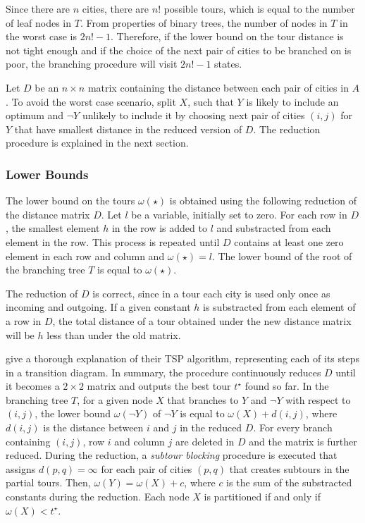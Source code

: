 \documentclass[a4paper,12pt]{article}
\begin{document}
Since there are $n$ cities, there are $n!$ possible tours, which is equal to the number of leaf nodes in $T$. From properties of binary trees, the number of nodes in $T$ in the worst case is $2n! - 1$. Therefore, if the lower bound on the tour distance is not tight enough and if the choice of the next pair of cities to be branched on is poor, the branching procedure will visit $2n! - 1$ states.

Let $D$ be an $n \times n$ matrix containing the distance between each pair of cities in $A$. To avoid the worst case scenario, \citet{Little63} split $X$, such that $Y$ is likely to include an optimum and $\neg Y$ unlikely to include it by choosing next pair of cities $(i,j)$ for $Y$ that have smallest distance in the reduced version of $D$. The reduction procedure is explained in the next section.

\subsubsection*{Lower Bounds}

The lower bound on the tours $\omega(\star)$ is obtained using the following reduction of the distance matrix $D$. Let $l$ be a variable, initially set to zero. For each row in $D$, the smallest element $h$ in the row is added to $l$ and substracted from each element in the row. This process is repeated until $D$ contains at least one zero element in each row and column and $\omega(\star) = l$. The lower bound of the root of the branching tree $T$ is equal to $\omega(\star)$.

The reduction of $D$ is correct, since in a tour each city is used only once as incoming and outgoing. If a given constant $h$ is substracted from each element of a row in $D$, the total distance of a tour obtained under the new distance matrix will be $h$ less than under the old matrix.

\citet{Little63} give a thorough explanation of their TSP algorithm, representing each of its steps in a transition diagram. In summary, the procedure continuously reduces $D$ until it becomes a $2 \times 2$ matrix and outputs the best tour $t^{\star}$ found so far. In the branching tree $T$, for a given node $X$ that branches to $Y$ and $\neg Y$ with respect to $(i,j)$, the lower bound $\omega(\neg Y)$ of $\neg Y$ is equal to $\omega(X) + d(i,j)$, where $d(i,j)$ is the distance between $i$ and $j$ in the reduced $D$. For every branch containing $(i,j)$, row $i$ and column $j$ are deleted in $D$ and the matrix is further reduced. During the reduction, a \textit{subtour blocking} procedure is executed that assigns $d(p,q) = \infty$ for each pair of cities $(p,q)$ that creates subtours in the partial tours. Then, $\omega(Y) = \omega(X) + c$, where $c$ is the sum of the substracted constants during the reduction. Each node $X$ is partitioned if and only if $\omega(X) < t^{\star}$.
\end{document}
